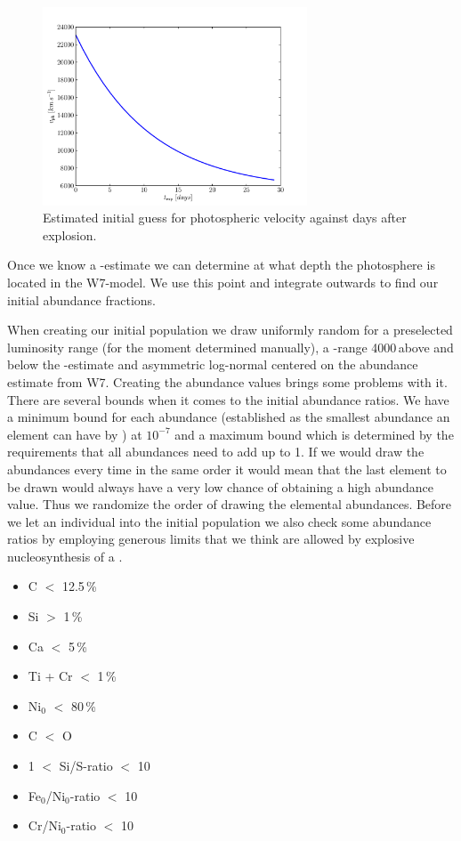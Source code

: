 \begin{figure}[htbp] %
   \centering
   \includegraphics[width=0.7\textwidth]{chapter_dalek/plots/plot_texp_vph.pdf} 
   \caption{Estimated initial guess for photospheric velocity against days after explosion. }
   \label{fig:Intrinsic }
\end{figure} 

Once we know a \vph-estimate we can determine at what depth the photosphere is located in the W7-model. We use this point and integrate outwards to find our initial abundance fractions.

When creating our initial population we draw uniformly random for a preselected luminosity range (for the moment determined manually), a \vph-range 4000\,\kms above and below the \vph-estimate and asymmetric log-normal centered on the abundance estimate from W7. Creating the abundance values brings some problems with it. There are several bounds when it comes to the initial abundance ratios. We have a minimum bound for each abundance (established as the smallest abundance an element can have by \mlc) at $10^{-7}$ and a maximum bound which is determined by the requirements that all abundances need to add up to 1. If we would draw the abundances every time in the same order it would mean that the last element to be drawn would always have a very low chance of obtaining a high abundance value. Thus we randomize the order of drawing the elemental abundances.  Before we let an individual into the initial population we also check some abundance ratios by employing generous limits that we think are allowed by explosive nucleosynthesis of a \cowd \citep[e.g.][]{1999ApJS..125..439I}. 

\begin{itemize}
\item C $<$ 12.5\,\%
\item Si $>$ 1\,\%
\item Ca $<$ 5\,\%
\item Ti + Cr $<$ 1\,\%
\item $\textrm{Ni}_0$ $<$ 80\,\%
\item C $<$ O
\item 1 $<$ Si/S-ratio $<$ 10
\item Fe$_0$/Ni$_0$-ratio $<$ 10
\item Cr/Ni$_0$-ratio $<$ 10
\end{itemize}

